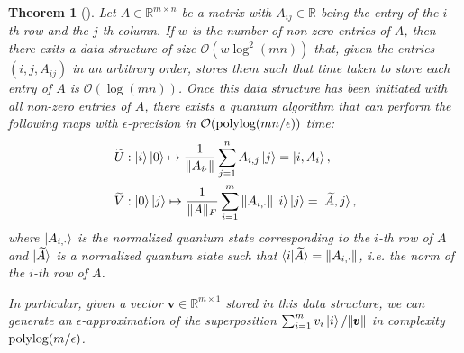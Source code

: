 \documentclass[10pt,twoside,reqno]{amsart} %
\theoremstyle{plain}
\newtheorem{thm}{Theorem}[section]
\theoremstyle{definition}
\begin{document}
\begin{thm}[\cite{chakraborty2019}]
  Let $A\in\mathbb{R}^{m\times n}$ be a matrix with $A_{ij}\in\mathbb{R}$ being
  the entry of the $i$-th row and the $j$-th column. If $w$ is the number
  of non-zero entries of $A$, then there exits a data structure of size 
  $\mathcal{O}\left(w\log^2(mn)\right)$ that, given the entries $(i,j,A_{ij})$
  in an arbitrary order, stores them such that time taken to store each
  entry of $A$ is $\mathcal{O}\left(\log(mn)\right)$. Once this data structure
  has been initiated with all non-zero entries of $A$, there exists a quantum
  algorithm that can perform the following maps with $\epsilon$-precision in
  $\mathcal{O}(\textrm{\normalfont polylog}(mn/\epsilon))$ time:
  \begin{align*}
    \widetilde{U}&:\ket{i}\ket{0}\mapsto\frac{1}{\|A_{i \cdot}\|}\sum_{j=1}^n
    A_{i,j}\ket{j}=\ket{i,A_i}, \\
    \widetilde{V}&:\ket{0}\ket{j}\mapsto\frac{1}{\|A\|_F}
    \sum_{i=1}^m\|A_{i,\cdot}\|
    \ket{i}\ket{j}=\ket{\widetilde{A},j},
  \end{align*}
  where $\ket{A_{i,\cdot}}$ is the normalized quantum state corresponding to
  the $i$-th row of $A$ and $\ket{\widetilde{A}}$ is a normalized quantum
  state such that $\braket{i|\widetilde{A}}=\|A_{i,\cdot}\|$, i.e. the norm
  of the $i$-th row of $A$.

  In particular, given a vector $\pmb{v}\in\mathbb{R}^{m\times1}$ stored in this
  data structure, we can generate an $\epsilon$-approximation of the
  superposition $\sum_{i=1}^m v_i\ket{i}/\|\pmb{v}\|$ in complexity
  $\textrm{\normalfont polylog}(m/\epsilon)$.
  \end{thm}
\end{document}
